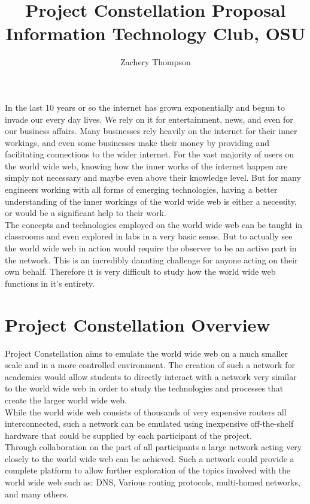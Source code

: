 \documentclass[12pt]{article}
\title{
Project Constellation Proposal
\\
Information Technology Club, OSU
}
\author{Zachery Thompson}
\begin{document}
\maketitle{}

\clearpage{}

In the last 10 years or so the internet has grown exponentially and begun to invade our every day lives. 
We rely on it for entertainment, news, and even for our business affairs. Many businesses
rely heavily on the internet for their inner workings, and even some businesses make their money by providing
and facilitating connections to the wider internet. For the vast majority of users on the world wide web, 
knowing how the inner works of the internet happen are simply not necessary and maybe even above their
knowledge level. But for many engineers working with all forms of emerging technologies, having a better
understanding of the inner workings of the world wide web is either a necessity, or would be a significant help
to their work.  
\\

The concepts and technologies employed on the world wide web can be taught in classrooms and even explored in
labs in a very basic sense. But to actually see the world wide web in action would require the observer to
be an active part in the network. This is an incredibly daunting challenge for anyone acting on their own 
behalf. Therefore it is very difficult to study how the world wide web functions in it's entirety.

\clearpage{}

\section{Project Constellation Overview}

Project Constellation aims to emulate the world wide web on a much smaller scale and in a more controlled
environment. The creation of such a network for academics would allow students to directly interact with a 
network very similar to the world wide web in order to study the technologies and processes that create the
larger world wide web.
\\

While the world wide web consists of thousands of very expensive routers all interconnected, such a network
can be emulated using inexpensive off-the-shelf hardware that could be supplied by each participant of the
project.
\\

Through collaboration on the part of all participants a large network acting very closely to the world wide 
web can be achieved. Such a network could provide a complete platform to allow further exploration of the topics
involved with the world wide web such as: DNS, Various routing protocols, multi-homed networks, and many others.
\end{document}

